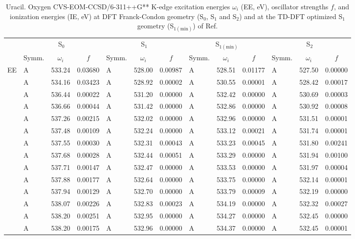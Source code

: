 \documentclass[journal=jctcce,manuscript=article]{achemso}
\begin{document}
\begin{table}
\caption{Uracil.  Oxygen CVS-EOM-CCSD/6-311++G** K-edge excitation energies $\omega_i$ (EE, eV), oscillator strengths $f$, and ionization energies (IE, eV) at DFT Franck-Condon geometry (S$_0$, S$_1$ and S$_2$) and at the TD-DFT optimized S$_1$ geometry (S$_{1(\text{min})}$) of Ref.
\label{Tab:Uracil_DFT}}
\scriptsize
\begin{tabular}{l|lcc|lcc|lcc|lcc}
\cline{2-13}
& \multicolumn{3}{c|}{S$_0$}
& \multicolumn{3}{c|}{S$_1$}  
& \multicolumn{3}{c|}{S$_{1(\text{min})}$}
& \multicolumn{3}{c}{S$_2$}
\\
\cline{2-13}
& Symm. & $\omega_i$ & $f$ 
& Symm. & $\omega_i$ & $f$ 
& Symm. & $\omega_i$ & $f$ 
& Symm. & $\omega_i$ & $f$\\
\hline
  EE 
& A & 533.24 & 0.03680 & A & 528.00 & 0.00987 & A & 528.51 & 0.01177 & A & 527.50 & 0.00000 \\
& A & 534.16 & 0.03423 & A & 528.92 & 0.00002 & A & 530.55 & 0.00001 & A & 528.42 & 0.00017 \\
& A & 536.44 & 0.00022 & A & 531.20 & 0.00000 & A & 532.42 & 0.00000 & A & 530.69 & 0.00003 \\
& A & 536.66 & 0.00044 & A & 531.42 & 0.00000 & A & 532.86 & 0.00000 & A & 530.92 & 0.00008 \\
& A & 537.26 & 0.00215 & A & 532.02 & 0.00000 & A & 532.96 & 0.00000 & A & 531.51 & 0.00001 \\
& A & 537.48 & 0.00109 & A & 532.24 & 0.00000 & A & 533.12 & 0.00021 & A & 531.74 & 0.00001 \\
& A & 537.55 & 0.00030 & A & 532.31 & 0.00043 & A & 533.23 & 0.00045 & A & 531.80 & 0.00241 \\
& A & 537.68 & 0.00028 & A & 532.44 & 0.00051 & A & 533.29 & 0.00000 & A & 531.94 & 0.00100 \\
& A & 537.71 & 0.00147 & A & 532.47 & 0.00000 & A & 533.53 & 0.00000 & A & 531.97 & 0.00004 \\
& A & 537.88 & 0.00177 & A & 532.64 & 0.00000 & A & 533.75 & 0.00000 & A & 532.14 & 0.00001 \\
& A & 537.94 & 0.00129 & A & 532.70 & 0.00000 & A & 533.79 & 0.00009 & A & 532.19 & 0.00000 \\
& A & 538.07 & 0.00226 & A & 532.83 & 0.00023 & A & 534.19 & 0.00000 & A & 532.32 & 0.00027 \\
& A & 538.20 & 0.00251 & A & 532.95 & 0.00000 & A & 534.27 & 0.00000 & A & 532.45 & 0.00000 \\
& A & 538.20 & 0.00175 & A & 532.96 & 0.00000 & A & 534.37 & 0.00000 & A & 532.45 & 0.00001 \\

\end{tabular}
\end{table}
\end{document}
